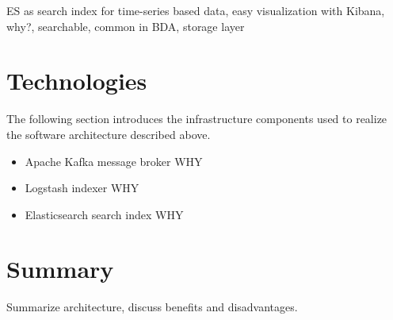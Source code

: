 ES as search index for time-series based data, easy visualization with Kibana, why?, searchable, common in BDA, storage layer

\section{Technologies}

The following section introduces the infrastructure components used to realize the software architecture described above.

\begin{itemize}
	\item Apache Kafka message broker  WHY
	\item Logstash indexer  WHY
	\item Elasticsearch search index  WHY
\end{itemize}

\section{Summary}

Summarize architecture, discuss benefits and disadvantages.


